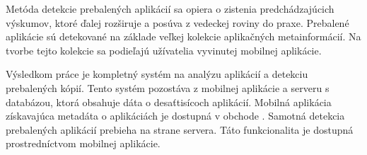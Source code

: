 Metóda detekcie prebalených aplikácií sa opiera o zistenia predchádzajúcich výskumov, ktoré ďalej rozširuje a posúva z vedeckej roviny do praxe. Prebalené aplikácie sú detekované na základe veľkej kolekcie aplikačných metainformácií. Na tvorbe tejto kolekcie sa podieľajú užívatelia vyvinutej mobilnej aplikácie. 

Výsledkom práce je kompletný systém na analýzu aplikácií a detekciu prebalených kópií. Tento systém pozostáva z mobilnej aplikácie a serveru s databázou, ktorá obsahuje dáta o desaťtisícoch aplikácií. Mobilná aplikácia získavajúca metadáta o aplikáciách je dostupná v obchode . Samotná detekcia prebalených aplikácií prebieha na strane servera. Táto funkcionalita je dostupná prostredníctvom mobilnej aplikácie.

